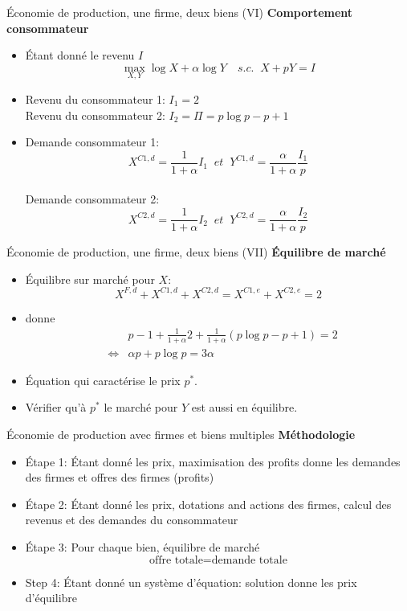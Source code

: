 \documentclass[handout]{beamer}
\newenvironment{iPar}[1]{\textbf{#1} \begin{itemize}}{\end{itemize}}
\begin{document}
\begin{frame}{Économie de production, une firme, deux biens (VI)}
\begin{iPar}{Comportement consommateur} \item<1-> Étant donné le revenu $I$ $$\max_{X,Y}
\log X + \alpha \log Y \quad s.c.\;\; X + pY = I$$ \item<2-> Revenu du consommateur 1: $I_1 = 2$ \\ \medskip Revenu du consommateur 2: $I_2 = \Pi =  p \log
p - p +1$ \item<3-> Demande consommateur 1: $$X^{C1,d} = \frac{1}{1+\alpha}
I_1 \;\; et \;\; Y^{C1,d} = \frac{\alpha}{1+\alpha} \frac{I_1}{p}$$ \\
\medskip Demande consommateur 2: $$X^{C2,d} = \frac{1}{1+\alpha} I_2 \;\; et
\;\; Y^{C2,d} = \frac{\alpha}{1+\alpha} \frac{I_2}{p}$$ \end{iPar}

\end{frame}

\begin{frame}{Économie de production, une firme, deux biens (VII)}
\begin{iPar}{Équilibre de marché} \item Équilibre sur marché pour $X$:
$$X^{F,d} + X^{C1,d} + X^{C2,d} = X^{C1,e} + X^{C2,e} = 2$$ \item donne
\begin{eqnarray*} & & p-1 + \frac{1}{1+\alpha}2 + \frac{1}{1+\alpha}(p\log p - p +1 ) = 2 \\
&\iff& \alpha p +p\log p = 3 \alpha\end{eqnarray*} \item Équation qui caractérise le prix
$p^*$. \item Vérifier qu'à $p^*$ le marché pour $Y$ est aussi en équilibre.
\end{iPar}

\end{frame}

\begin{frame}{Économie de production avec firmes et biens multiples}
\begin{iPar}{Méthodologie} \item[Étape 1:] Étant donné les prix, maximisation des profits donne les demandes des firmes et offres des firmes (profits)  \pause  \item[Étape 2:] Étant donné les prix,
dotations and actions des firmes, calcul des revenus et des demandes du consommateur  \pause \item[Étape 3:] Pour chaque bien, équilibre de marché $$\textrm{offre totale} =
\textrm{demande totale}$$ \pause \item[Step 4:] Étant donné un système d'équation: solution donne les prix d'équilibre \end{iPar} \end{frame}
\end{document}
